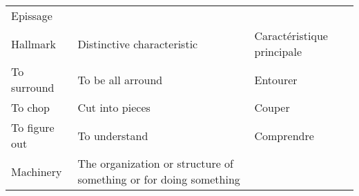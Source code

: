 \documentclass[]{article}
\begin{document}
\begin{longtable}[]{@{}lll@{}}
\begin{minipage}[t]{0.56\columnwidth}
Epissage\strut
\end{minipage}\tabularnewline
\begin{minipage}[t]{0.18\columnwidth}\raggedright
Hallmark\strut
\end{minipage} & \begin{minipage}[t]{0.18\columnwidth}\raggedright
Distinctive characteristic\strut
\end{minipage} & \begin{minipage}[t]{0.56\columnwidth}\raggedright
Caractéristique principale\strut
\end{minipage}\tabularnewline
\begin{minipage}[t]{0.18\columnwidth}\raggedright
To surround\strut
\end{minipage} & \begin{minipage}[t]{0.18\columnwidth}\raggedright
To be all arround\strut
\end{minipage} & \begin{minipage}[t]{0.56\columnwidth}\raggedright
Entourer\strut
\end{minipage}\tabularnewline
\begin{minipage}[t]{0.18\columnwidth}\raggedright
To chop\strut
\end{minipage} & \begin{minipage}[t]{0.18\columnwidth}\raggedright
Cut into pieces\strut
\end{minipage} & \begin{minipage}[t]{0.56\columnwidth}\raggedright
Couper\strut
\end{minipage}\tabularnewline
\begin{minipage}[t]{0.18\columnwidth}\raggedright
To figure out\strut
\end{minipage} & \begin{minipage}[t]{0.18\columnwidth}\raggedright
To understand\strut
\end{minipage} & \begin{minipage}[t]{0.56\columnwidth}\raggedright
Comprendre\strut
\end{minipage}\tabularnewline
\begin{minipage}[t]{0.18\columnwidth}\raggedright
Machinery\strut
\end{minipage} & \begin{minipage}[t]{0.18\columnwidth}\raggedright
The organization or structure of something or for doing something\strut
\end{minipage} & \begin{minipage}[t]{0.56\columnwidth}\raggedright

\end{minipage}
\end{longtable}
\end{document}
